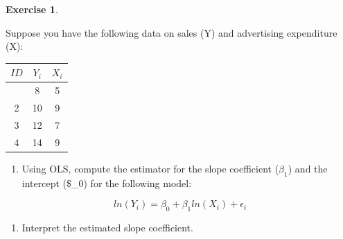 \documentclass[
]{book}
\providecommand{\tightlist}{%
  \setlength{\itemsep}{0pt}\setlength{\parskip}{0pt}}
\theoremstyle{definition}
\theoremstyle{definition}
\theoremstyle{definition}
\newtheorem{exercise}{Exercise}[chapter]
\theoremstyle{definition}
\theoremstyle{remark}
\begin{document}
\begin{exercise}
\protect\hypertarget{exr:unnamed-chunk-17}{}\label{exr:unnamed-chunk-17}

Suppose you have the following data on sales (Y) and advertising expenditure (X):

\begin{longtable}[]{@{}ccc@{}}
\toprule\noalign{}
\(ID\) & \(Y_i\) & \(X_i\) \\
\midrule\noalign{}
\endhead
\bottomrule\noalign{}
\endlastfoot
1 & 8 & 5 \\
2 & 10 & 9 \\
3 & 12 & 7 \\
4 & 14 & 9 \\
\end{longtable}

\begin{enumerate}
\def\labelenumi{\alph{enumi}.}
\tightlist
\item
  Using OLS, compute the estimator for the slope coefficient (\(\beta_1\)) and the intercept (\$\beta\_0) for the following model:
\end{enumerate}

\[ln(Y_i) = \beta_0 + \beta_1 ln(X_i) + \epsilon_i\]

\begin{enumerate}
\def\labelenumi{\alph{enumi}.}
\setcounter{enumi}{1}
\tightlist
\item
  Interpret the estimated slope coefficient.
\end{enumerate}

\end{exercise}
\end{document}
